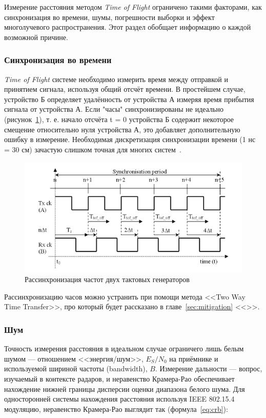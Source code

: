 Измерение расстояния методом \textit{Time of Flight} ограничено такими факторами, как синхронизация во времени, шумы, погрешности выборки и эффект многолучевого распространения. Этот раздел обобщает информацию о каждой возможной причине.

\subsubsection{Синхронизация во времени}

\textit{Time of Flight} системе необходимо измерить время между отправкой и принятием сигнала, используя общий отсчёт времени. В простейшем случае, устройство Б определяет удалённость от устройства А измеряя время прибытия сигнала от устройства А. Если "часы" синхронизированы не идеально (рисунок~\ref{fig:sync}), т. е. начало отсчёта t = 0 устройства Б содержит некоторое смещение относительно нуля устройства А, это добавляет дополнительную ошибку в измерение. Необходимая дискретизация синхронизации времени (1 нс = 30 см) зачастую слишком точная для многих систем~\cite{tof:lowcost}.

\begin{figure}[ht]
    \includegraphics[width=.8\linewidth]{Figures/sync.png}
    \caption{Рассинхронизация частот двух тактовых генераторов}
    \label{fig:sync}
\end{figure}

Рассинхронизацию часов можно устранить при помощи метода <<Two Way Time Transfer>>, про который будет рассказано в главе~\ref{sec:mitigation} <<>>.

\subsubsection{Шум}

Точность измерения расстояния в идеальном случае ограничего лишь белым шумом --- отношением <<энергия/шум>>, $E_S/N_0$ на приёмнике и используемой шириной частоты (bandwidth), $B$. Измерение дальности --- вопрос, изучаемый в контексте радаров, и неравенство Крамера-Рао обеспечивает нахождение нижней границы дисперсии оценки диапазона белого шума. Для односторонней системы нахождения расстояния используя IEEE 802.15.4 модуляцию, неравенство Крамера-Рао выглядит так (формула~\eqref{eq:crb}):

